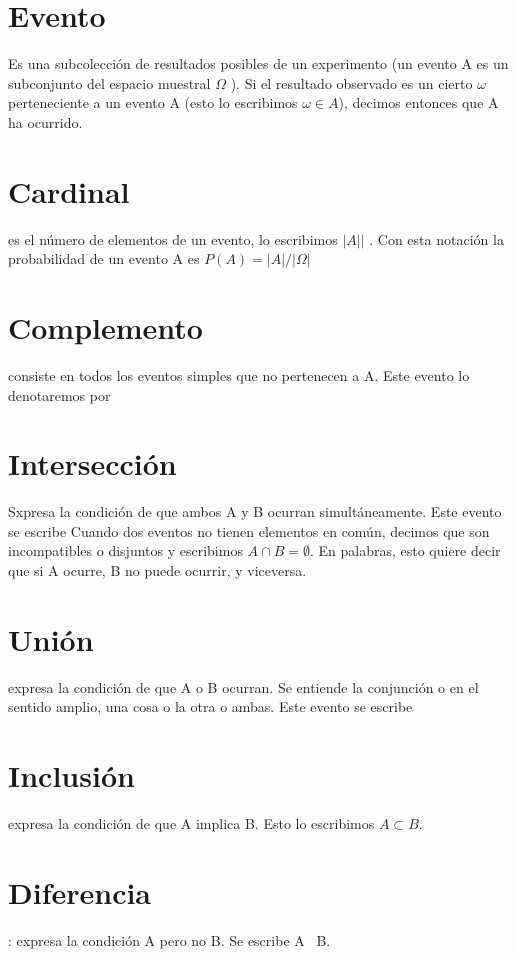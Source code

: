 \documentclass[12pt]{book}
\begin{document}
\section{Evento}
Es una subcolección de resultados posibles de un experimento (un evento A es un subconjunto del espacio muestral $ \Omega $ ). Si el resultado observado es un cierto $ \omega$ perteneciente a un evento A (esto lo escribimos $ \omega \in A $), decimos entonces que A ha ocurrido.

\section{Cardinal}
es el número de elementos de un evento, lo escribimos $ \vert A \vert| $ . Con esta notación la probabilidad de un evento A es $P ( A ) = | A | / | \Omega |$

\section{Complemento}
 consiste en todos los eventos simples que no pertenecen a A. Este evento lo denotaremos por


\section{Intersección}Sxpresa la condición de que ambos A y B ocurran simultáneamente. Este evento se escribe Cuando dos eventos no tienen elementos en común, decimos que son incompatibles o disjuntos y escribimos $A \cap B = \emptyset $. En palabras, esto quiere decir que si A ocurre, B no puede ocurrir, y viceversa.


\section{Unión}expresa la condición de que A o B ocurran. Se entiende la conjunción o en el sentido amplio, una cosa o la otra o ambas. Este evento se escribe


\section{Inclusión} expresa la condición de que A implica B. Esto lo escribimos $A \subset B$.


\section{Diferencia}: expresa la condición A pero no B. Se escribe A \ B.
\end{document}
